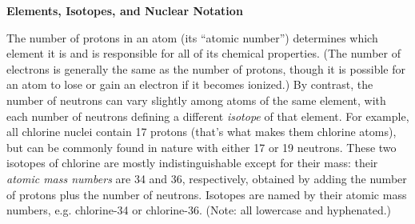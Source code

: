 {\medskip

\textbf{Elements, Isotopes, and Nuclear Notation}

The number of protons in an atom (its ``atomic number'') determines which element it is and is responsible for all of its chemical properties.  (The number of electrons is generally the same as the number of protons, though it is possible for an atom to lose or gain an electron if it becomes ionized.)  By contrast, the number of neutrons can vary slightly among atoms of the same element, with each number of neutrons defining a different \textit{isotope} of that element.  For example, all chlorine nuclei contain 17 protons (that's what makes them chlorine atoms), but can be commonly found in nature with either 17 or 19 neutrons.  These two isotopes of chlorine are mostly indistinguishable except for their mass:  
their \textit{atomic mass numbers} 
are 34 and 36, respectively, obtained by adding the number of protons plus the number of neutrons.  
Isotopes are named by their atomic mass numbers, e.g. chlorine-34 or chlorine-36.
(Note: all lowercase and hyphenated.)



{\setlength{\baselineskip}{1.1 \baselineskip}

}}
